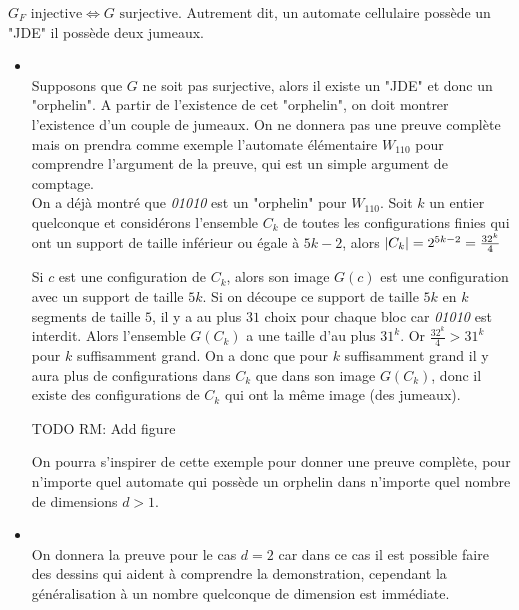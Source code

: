 \begin{theorem}
	$G_F \text{ injective} \iff G \text{ surjective}$. Autrement dit, un automate cellulaire possède un "JDE" \ssi il possède deux jumeaux.
\end{theorem}



\begin{proofI}
	\begin{itemize}
		\item \bimpLR\\
		      Supposons que $G$ ne soit pas surjective, alors il existe un "JDE" et donc un "orphelin".
		      A partir de l'existence de cet "orphelin", on doit montrer l'existence d'un couple de jumeaux.
		      On ne donnera pas une preuve complète mais on prendra comme exemple l'automate élémentaire $W_{110}$ pour
		      comprendre l'argument de la preuve, qui est un simple argument de comptage.\\ 
		      On a déjà montré que \emph{01010} est un "orphelin" pour $W_{110}$. Soit $k$ un entier quelconque
		      et considérons  l'ensemble $C_k$ de toutes les configurations finies qui ont un support de taille
		      inférieur ou égale à $5k-2$, alors $\left|C_k\right| = 2^{5k-2} = \frac {32^k} 4$

		      Si $c$ est une configuration de $C_k$, alors son image $G(c)$ est une configuration avec un support de taille $5k$.
		      Si on découpe ce support de taille $5k$ en $k$ segments de taille $5$, il y a au plus $31$ choix pour chaque bloc car
		      \emph{01010} est interdit. Alors l'ensemble $G(C_k)$ a une taille d'au plus $31^k$.
		      Or $\frac {32^k} 4 > 31 ^ k$ pour  $k$ suffisamment grand. On a donc que pour $k$ suffisamment grand 
		      il y aura plus de configurations
		      dans $C_k$ que dans son image $G(C_k)$, donc il existe des configurations de 
		      $C_k$ qui ont la même image (des jumeaux).
		      
		      TODO RM: Add figure

		      On pourra s'inspirer de cette exemple pour donner une preuve complète, pour n'importe quel automate qui possède un 
		      orphelin dans n'importe
		      quel nombre de dimensions $d > 1$.


		\item \bimpRL\\
		      On donnera la preuve pour le cas $d=2$ car dans ce cas il est possible faire des dessins qui aident à 
		      comprendre la demonstration, cependant la généralisation à un nombre quelconque de dimension est immédiate.
		      

\end{itemize}
\end{proofI}
